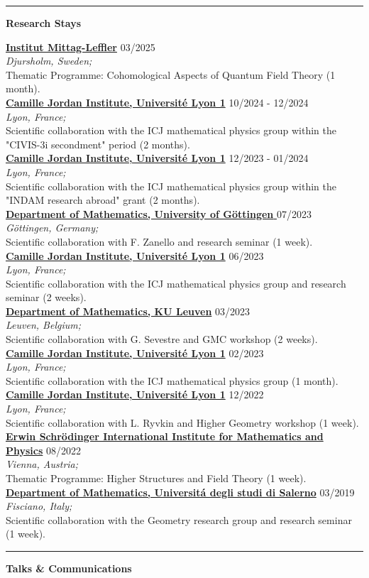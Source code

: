 \documentclass[a4paper]{article}
\newcommand{\block}[1]{\hrule \vspace{0.2cm} \textbf{\Large #1} \vspace{0.2cm}}
\newcommand{\voice}[5]{\href{#4}{\textbf{#1}} \hfill #2 \\ \textit{#3} \\ {\small #5} \vspace{0.2cm} \\}
\begin{document}
	\block{Research Stays}

	\voice{Institut Mittag-Leffler}
		{03/2025}
		{Djursholm, Sweden;}
		{https://www.mittag-leffler.se/activities/cohomological-aspects-of-quantum-field-theory/}     
		{Thematic Programme: Cohomological Aspects of Quantum Field Theory (1 month).}
	\voice{Camille Jordan Institute, Université Lyon 1}
		{10/2024 - 12/2024}
		{Lyon, France;}
		{None}       
		{Scientific collaboration with the ICJ mathematical physics group within the "CIVIS-3i secondment" period (2 months).}
	\voice{Camille Jordan Institute, Université Lyon 1}
		{12/2023 - 01/2024}
		{Lyon, France;}
		{None}       
		{Scientific collaboration with the ICJ mathematical physics group within the "INDAM research abroad" grant (2 months).}
	\voice{Department of Mathematics, University of Göttingen }
		{07/2023}
		{Göttingen, Germany;}
		{None}       
		{Scientific collaboration with F. Zanello and research seminar (1 week).}
	\voice{Camille Jordan Institute, Université Lyon 1}
		{06/2023}
		{Lyon, France;}
		{None}       
		{Scientific collaboration with the ICJ mathematical physics group and research seminar (2 weeks).}
	\voice{Department of Mathematics, KU Leuven}
		{03/2023}
		{Leuven, Belgium;}
		{None}       
		{Scientific collaboration with G. Sevestre and GMC workshop (2 weeks).}
	\voice{Camille Jordan Institute, Université Lyon 1}
		{02/2023}
		{Lyon, France;}
		{None}       
		{Scientific collaboration with the ICJ mathematical physics group (1 month).}
	\voice{Camille Jordan Institute, Université Lyon 1}
		{12/2022}
		{Lyon, France;}
		{None}       
		{Scientific collaboration with L. Ryvkin and Higher Geometry workshop (1 week).}
	\voice{Erwin Schrödinger International Institute for Mathematics and Physics}
		{08/2022}
		{Vienna, Austria;}
		{https://www.esi.ac.at/events/e430/}       
		{Thematic Programme: Higher Structures and Field Theory (1 week).}
	\voice{Department of Mathematics, Universit\'a degli studi di Salerno}
		{03/2019}
		{Fisciano, Italy;}
		{http://geometria.dipmat.unisa.it/events.html}       
		{Scientific collaboration with the Geometry research group and research seminar (1 week).}

	\block{Talks \& Communications}
\end{document}
